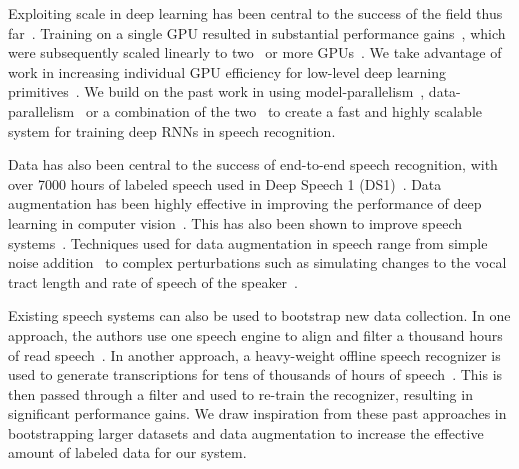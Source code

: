 Exploiting scale in deep learning has been central to the success of the field
thus far~\cite{krizhevsky2012imagenet, le2013}. Training on a single GPU
resulted in substantial performance gains~\cite{raina2009}, which were
subsequently scaled linearly to two~\cite{krizhevsky2012imagenet} or more
GPUs~\cite{coates2013cotshpc}. We take advantage of work in increasing
individual GPU efficiency for low-level deep learning
primitives~\cite{chetlur2014cudnn}. We build on the past work in using
model-parallelism~\cite{coates2013cotshpc}, data-parallelism~\cite{dean2012} or
a combination of the two~\cite{szegedy2015, hannun2014deepspeech} to create a
fast and highly scalable system for training deep RNNs in speech recognition.

Data has also been central to the success of end-to-end speech recognition,
with over 7000 hours of labeled speech used in Deep Speech 1
(DS1)~\cite{hannun2014deepspeech}. Data augmentation has been highly effective
in improving the performance of deep learning in computer
vision~\cite{lecun2004, sapp2008, coates2011}. This has also been shown to
improve speech systems~\cite{gales2009, hannun2014deepspeech}. Techniques used
for data augmentation in speech range from simple noise
addition~\cite{hannun2014deepspeech} to complex perturbations such as
simulating changes to the vocal tract length and rate of speech of the
speaker~\cite{jaitly2013, ko2015}.

Existing speech systems can also be used to bootstrap new data collection. In
one approach, the authors use one speech engine to align and filter a thousand
hours of read speech~\cite{panayotov2015}. In another approach, a heavy-weight
offline speech recognizer is used to generate transcriptions for tens of
thousands of hours of speech~\cite{kapralova2014}. This is then passed through
a filter and used to re-train the recognizer, resulting in significant
performance gains. We draw inspiration from these past approaches in
bootstrapping larger datasets and data augmentation to increase the effective
amount of labeled data for our system.
